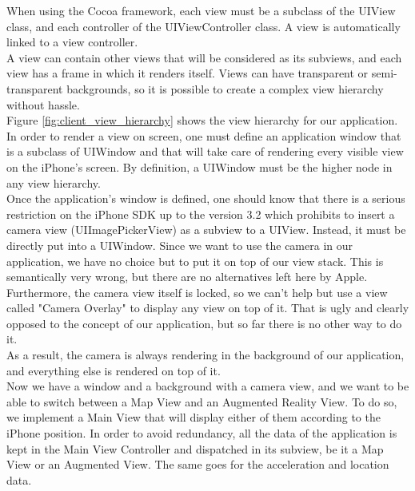 When using the Cocoa framework, each view must be a subclass of the UIView class, and each controller of the UIViewController class. A view is automatically linked to a view controller.\\

A view can contain other views that will be considered as its subviews, and each view has a frame in which it renders itself. Views can have transparent or semi-transparent backgrounds, so it is possible to create a complex view hierarchy without hassle.\\

Figure \ref{fig:client_view_hierarchy} shows the view hierarchy for our application.\\

In order to render a view on screen, one must define an application window that is a subclass of UIWindow and that will take care of rendering every visible view on the iPhone's screen. By definition, a UIWindow must be the higher node in any view hierarchy.\\

Once the application's window is defined, one should know that there is a serious restriction on the iPhone SDK up to the version 3.2 which prohibits to insert a camera view (UIImagePickerView) as a subview to a UIView. Instead, it must be directly put into a UIWindow. Since we want to use the camera in our application, we have no choice but to put it on top of our view stack. This is semantically very wrong, but there are no alternatives left here by Apple.\\

Furthermore, the camera view itself is locked, so we can't help but use a view called "Camera Overlay" to display any view on top of it. That is ugly and clearly opposed to the concept of our application, but so far there is no other way to do it.\\

As a result, the camera is always rendering in the background of our application, and everything else is rendered on top of it.\\

Now we have a window and a background with a camera view, and we want to be able to switch between a Map View and an Augmented Reality View. To do so, we implement a Main View that will display either of them according to the iPhone position. In order to avoid redundancy, all the data of the application is kept in the Main View Controller and dispatched in its subview, be it a Map View or an Augmented View. The same goes for the acceleration and location data.\\

